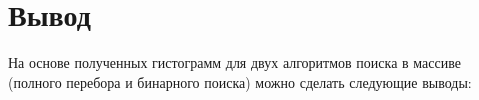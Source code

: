 


\section{Вывод}
На основе полученных гистограмм для двух алгоритмов поиска в массиве (полного перебора и бинарного поиска) можно сделать следующие выводы:

